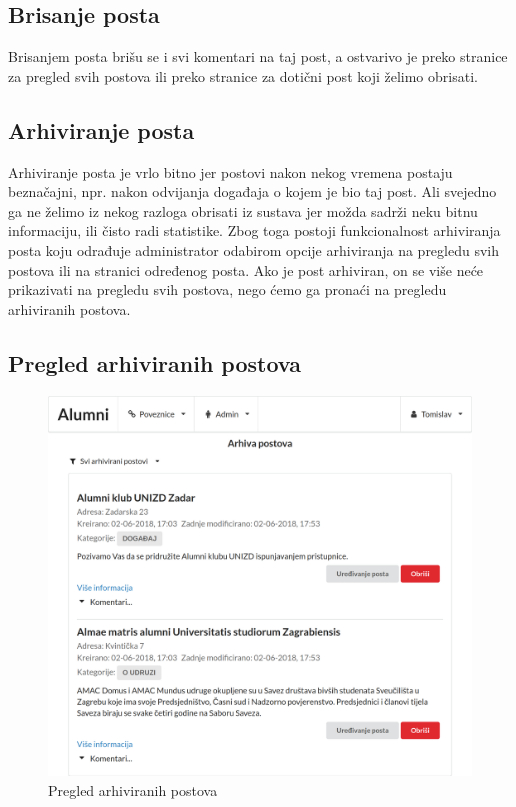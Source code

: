 \documentclass[zavrsni, numeric]{fer}
\begin{document}
\subsection{Brisanje posta}
Brisanjem posta brišu se i svi komentari na taj post, a ostvarivo je preko stranice za pregled svih postova ili preko stranice za dotični post koji želimo obrisati.

\subsection{Arhiviranje posta}
Arhiviranje posta je vrlo bitno jer postovi nakon nekog vremena postaju beznačajni, npr. nakon odvijanja događaja o kojem je bio taj post. Ali svejedno ga ne želimo iz nekog razloga obrisati iz sustava jer možda sadrži neku bitnu informaciju, ili čisto radi statistike. Zbog toga postoji funkcionalnost arhiviranja posta koju odrađuje administrator odabirom opcije arhiviranja na pregledu svih postova ili na stranici određenog posta. Ako je post arhiviran, on se više neće prikazivati na pregledu svih postova, nego ćemo ga pronaći na pregledu arhiviranih postova.

\subsection{Pregled arhiviranih postova}

\begin{figure}[H]
	\centering
	\includegraphics[width=13cm]{slike/arhivirani-postovi.png}
	\caption{Pregled arhiviranih postova}
	\label{fig:arhivirani-postovi}
\end{figure}
\end{document}
